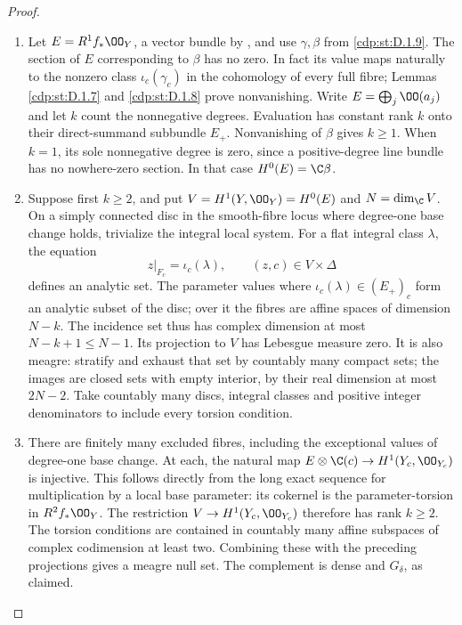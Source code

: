 \begin{proof}

\begin{enumerate}[label={$\langle1\rangle$\arabic*.},leftmargin=*]
\item Let $E=R^1f_*\OO_Y$, a vector bundle by \cite[Theorem~2.2, pp.~4--5]{Viaclovsky2026Combs}, and use
$\gamma,\beta$ from \ref{cdp:st:D.1.9}. The section of $E$ corresponding to
$\beta$ has no zero. In fact its value maps naturally to the
nonzero class $\iota_c(\gamma_c)$ in the cohomology of every full
fibre; Lemmas \ref{cdp:st:D.1.7} and \ref{cdp:st:D.1.8} prove nonvanishing. Write
$E=\bigoplus_j\OO(a_j)$ and let $k$ count the nonnegative degrees.
Evaluation has constant rank $k$ onto their direct-summand subbundle
$E_+$. Nonvanishing of $\beta$ gives $k\geq1$. When $k=1$, its
sole nonnegative degree is zero, since a positive-degree line bundle
has no nowhere-zero section. In that case $H^0(E)=\C\beta$.

\item Suppose first $k\geq2$, and put $V=H^1(Y,\OO_Y)=H^0(E)$ and
$N=\dim_{\C}V$. On a simply connected disc in the smooth-fibre
locus where degree-one base change holds, trivialize the integral
local system. For a flat integral
class $\lambda$, the equation
\[
z|_{F_c}=\iota_c(\lambda),\qquad (z,c)\in V\times\Delta
\]
defines an analytic set. The parameter values where
$\iota_c(\lambda)\in(E_+)_c$ form an analytic subset of the disc;
over it the fibres are affine spaces of dimension $N-k$.
The incidence set thus has complex dimension at most
$N-k+1\leq N-1$. Its projection to $V$ has Lebesgue
measure zero. It is also meagre: stratify and exhaust that set
by countably many compact sets; the images are closed sets with
empty interior, by their real dimension at most $2N-2$.
Take countably many discs, integral classes and positive integer
denominators to include every torsion condition.

\item There are finitely many excluded fibres, including the exceptional
values of degree-one base change. At each, the natural map
$E\otimes\C(c)\to H^1(Y_c,\OO_{Y_c})$ is injective. This follows
directly from the long exact sequence for multiplication by a local
base parameter: its cokernel is the parameter-torsion in
$R^2f_*\OO_Y$. The restriction $V\to H^1(Y_c,\OO_{Y_c})$
therefore has rank $k\geq2$. The torsion conditions are contained in
countably many affine subspaces of complex codimension at least
two. Combining these with the preceding projections gives a
meagre null set. The complement is dense and $G_\delta$, as claimed.


\end{enumerate}
\end{proof}
